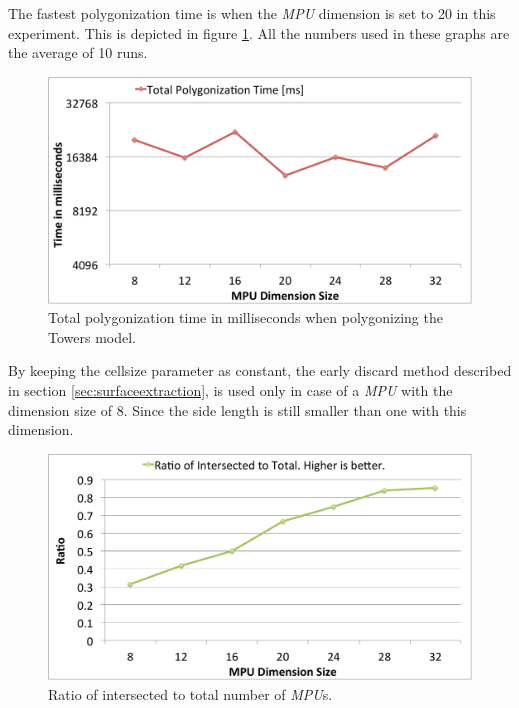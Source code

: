 The fastest polygonization time is when the \textit{MPU} dimension is set to 20 in this experiment. 
This is depicted in figure \ref{fig:TotalPolyTime}. All the numbers used in these graphs are the average of 10 runs. 

\begin{figure}[H]
  \centering
  \includegraphics[width = 1.0\linewidth]{figures/cpupoly/MpuSizeAnalysis/TotalPolyTime.pdf}
  \caption{\label{fig:TotalPolyTime}
  {Total polygonization time in milliseconds when polygonizing the Towers model.}
}
\end{figure}

By keeping the cellsize parameter as constant, the early discard method described 
in section \ref{sec:surfaceextraction}, is used only in case of a \textit{MPU} 
with the dimension size of 8. Since the side length is still smaller than one
with this dimension. 

\begin{figure}[H]
  \centering
  \includegraphics[width = 1.0\linewidth]{figures/cpupoly/MpuSizeAnalysis/RatioOfIntersectedToTotal.pdf}
  \caption{\label{fig:RatioOfIntersectedToTotal}
  {Ratio of intersected to total number of \textit{MPU}s.}
}
\end{figure}

